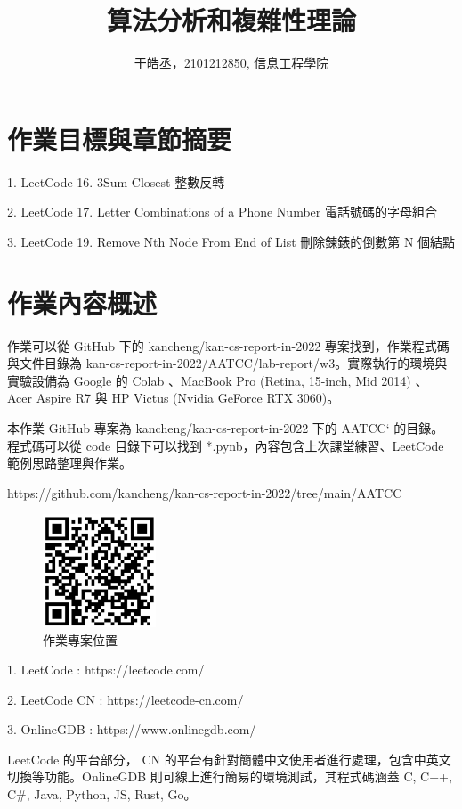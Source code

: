 \documentclass[10pt,UTF8]{ctexart}
\title{算法分析和複雜性理論}
\author{干皓丞，2101212850, 信息工程學院}
\begin{document}
\maketitle


\section{作業目標與章節摘要}

1. LeetCode 16. 3Sum Closest 整數反轉

2. LeetCode 17. Letter Combinations of a Phone Number 電話號碼的字母組合

3. LeetCode 19. Remove Nth Node From End of List 刪除鍊錶的倒數第 N 個結點


\section{作業內容概述}

作業可以從 GitHub 下的 kancheng/kan-cs-report-in-2022 專案找到，作業程式碼與文件目錄為 kan-cs-report-in-2022/AATCC/lab-report/w3。實際執行的環境與實驗設備為 Google 的 Colab 、MacBook Pro (Retina, 15-inch, Mid 2014) 、 Acer Aspire R7 與 HP Victus (Nvidia GeForce RTX 3060)。

本作業 GitHub 專案為 kancheng/kan-cs-report-in-2022 下的 AATCC` 的目錄。程式碼可以從 code 目錄下可以找到 *.pynb，內容包含上次課堂練習、LeetCode 範例思路整理與作業。

https://github.com/kancheng/kan-cs-report-in-2022/tree/main/AATCC

\begin{figure}[H]
\centering 
\includegraphics[width=0.30\textwidth]{aatccqr.png} 
\caption{作業專案位置}
\label{Test}
\end{figure}


1. LeetCode : https://leetcode.com/

2. LeetCode CN : https://leetcode-cn.com/

3. OnlineGDB : https://www.onlinegdb.com/ 

LeetCode 的平台部分， CN 的平台有針對簡體中文使用者進行處理，包含中英文切換等功能。OnlineGDB 則可線上進行簡易的環境測試，其程式碼涵蓋 C, C++, C\#, Java, Python, JS, Rust, Go。
\end{document}
